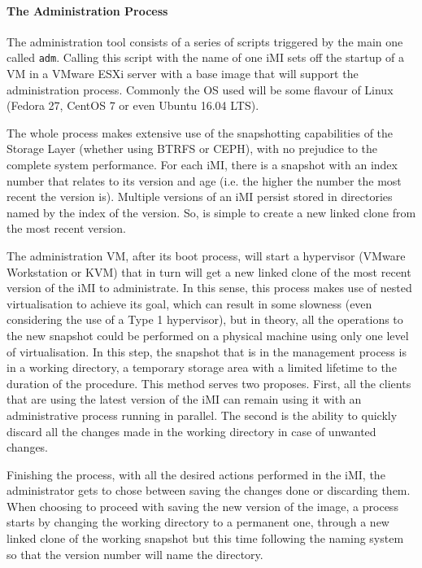 
\paragraph{The Administration Process}
\label{par:admin_imi}
The administration tool consists of a series of scripts triggered by the main one called \texttt{adm}. Calling this script with the name of one iMI sets off the startup of a VM in a VMware ESXi server with a base image that will support the administration process. Commonly the OS used will be some flavour of Linux (Fedora 27, CentOS 7 or even Ubuntu 16.04 LTS).

The whole process makes extensive use of the snapshotting capabilities of the Storage Layer (whether using BTRFS or CEPH), with no prejudice to the complete system performance. For each iMI, there is a snapshot with an index number that relates to its version and age (i.e. the higher the number the most recent the version is). Multiple versions of an iMI persist stored in directories named by the index of the version. So, is simple to create a new linked clone from the most recent version.

The administration VM, after its boot process, will start a hypervisor (VMware Workstation or KVM) that in turn will get a new linked clone of the most recent version of the iMI to administrate. In this sense, this process makes use of nested virtualisation to achieve its goal, which can result in some slowness (even considering the use of a Type 1 hypervisor), but in theory, all the operations to the new snapshot could be performed on a physical machine using only one level of virtualisation. 
In this step, the snapshot that is in the management process is in a working directory, a temporary storage area with a limited lifetime to the duration of the procedure. This method serves two proposes. First, all the clients that are using the latest version of the iMI can remain using it with an administrative process running in parallel. The second is the ability to quickly discard all the changes made in the working directory in case of unwanted changes.

Finishing the process, with all the desired actions performed in the iMI, the administrator gets to chose between saving the changes done or discarding them. When choosing to proceed with saving the new version of the image, a process starts by changing the working directory to a permanent one, through a new linked clone of the working snapshot but this time following the naming system so that the version number will name the directory.


